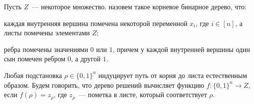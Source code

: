 Пусть $Z$~--- некоторое множество.  назовем такое корневое бинарное дерево, что:
\begin{itemtask}
    \item каждая внутренняя вершина помечена некоторой переменной $x_i$, где $i \in [n]$, а листы
        помечены элементами $Z$;
    \item ребра помечены значениями $0$ или $1$, причем у каждой внутренней вершины один сын помечен
        ребром $0$, а другой $1$.
\end{itemtask}

Любая подстановка $\rho \in \{0, 1\}^n$ индуцирует путь от корня до листа естественным образом. Будем
говорить, что дерево решений вычисляет функцию $f\colon \{0, 1\}^n \rightarrow Z$, если $f(\rho) =
z_{\rho}$, где $z_{\rho}$~--- пометка в листе, который соответствует $\rho$.
